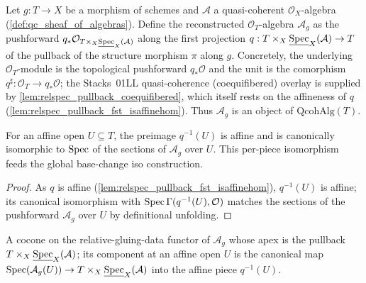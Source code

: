 \begin{definition}
  \label{def:relspec_qcoh_pullback}
  Let \(g : T \to X\) be a morphism of schemes and \(\mathcal{A}\) a quasi-coherent
  \(\mathcal{O}_X\)-algebra (\cref{def:qc_sheaf_of_algebras}). Define the reconstructed
  \(\mathcal{O}_T\)-algebra \(\mathcal{A}_g\) as the pushforward
  \(q_* \mathcal{O}_{T \times_X \underline{\operatorname{Spec}}_X(\mathcal{A})}\) along the first
  projection \(q : T \times_X \underline{\operatorname{Spec}}_X(\mathcal{A}) \to T\) of the pullback of
  the structure morphism \(\pi\) along \(g\). Concretely, the underlying
  \(\mathcal{O}_T\)-module is the topological pushforward \(q_* \mathcal{O}\) and the unit
  is the comorphism \(q^\sharp : \mathcal{O}_T \to q_* \mathcal{O}\); the Stacks~01LL
  quasi-coherence (coequifibered) overlay is supplied by
  \cref{lem:relspec_pullback_coequifibered}, which itself rests on the affineness of \(q\)
  (\cref{lem:relspec_pullback_fst_isaffinehom}). Thus \(\mathcal{A}_g\) is an object of
  \(\mathrm{QcohAlg}(T)\).
\end{definition}

\begin{definition}
  \label{def:relspec_pullback_iso_affine_piece}
  For an affine open \(U \subseteq T\), the preimage \(q^{-1}(U)\) is affine and is
  canonically isomorphic to \(\operatorname{Spec}\) of the sections of \(\mathcal{A}_g\) over \(U\).
  This per-piece isomorphism feeds the global base-change
  iso construction.
\end{definition}

\begin{proof}
  As \(q\) is affine (\cref{lem:relspec_pullback_fst_isaffinehom}), \(q^{-1}(U)\) is
  affine; its canonical isomorphism with \(\operatorname{Spec} \Gamma(q^{-1}(U), \mathcal{O})\) matches
  the sections of the pushforward \(\mathcal{A}_g\) over \(U\) by definitional
  unfolding.
\end{proof}

\begin{definition}
  \label{def:relspec_pullback_cocone}
  A cocone on the relative-gluing-data functor of \(\mathcal{A}_g\) whose apex is the
  pullback \(T \times_X \underline{\operatorname{Spec}}_X(\mathcal{A})\); its component at an affine
  open \(U\) is the canonical map \(\operatorname{Spec}(\mathcal{A}_g(U)) \to
  T \times_X \underline{\operatorname{Spec}}_X(\mathcal{A})\) into the affine piece \(q^{-1}(U)\).
\end{definition}

